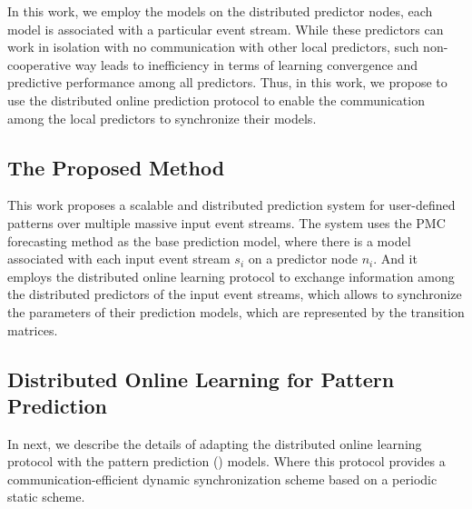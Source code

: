   
  \par In this work, we employ the \pmcmr models on the distributed predictor nodes, each model is associated with a particular event stream. While these predictors can work in isolation with no communication with other local predictors, such non-cooperative way leads to inefficiency in terms of learning convergence and predictive performance among all predictors. Thus, in this work, we propose to use the distributed online prediction protocol \cite{kamp2014communication} to enable the communication among the local predictors to synchronize their models.     
%

\subsection{The Proposed Method}
\label{sec:proposed_approach}

\par This work proposes a scalable and distributed prediction system for user-defined patterns over multiple massive input event streams. The system  uses the PMC forecasting method \cite{alevizos2017event} as the base prediction model, where there is a \pmcmr model associated with each input event stream $s_i$ on a predictor node $n_i$. And it employs the distributed online learning protocol \cite{kamp2014communication} to exchange information among the distributed predictors of the input event streams, which allows to synchronize the parameters of their prediction models, which are represented by the transition matrices.

%

\subsection*{Distributed Online Learning for Pattern Prediction}

\par In next, we describe the details of adapting the distributed online learning protocol \cite{kamp2014communication} with the pattern prediction (\pmcmr) models. Where this protocol provides a communication-efficient dynamic synchronization scheme based on a periodic static scheme.


